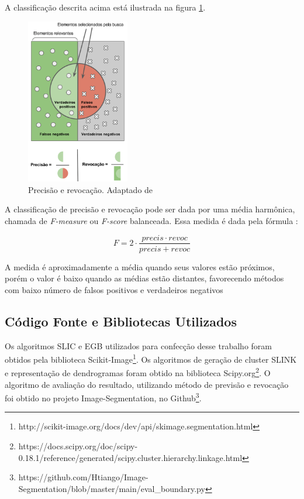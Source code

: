 \begin{document}
A classificação descrita acima está ilustrada na figura \ref{fig:PREC_RECALL}. 

\begin{figure}[ht]
\centering
\includegraphics[width=0.4\textwidth]{precision_recall.png}
\caption{Precisão e revocação. Adaptado de \cite{WIKI_PREC_RECALL}}
\label{fig:PREC_RECALL}
\end{figure}

A classificação de precisão e revocação pode ser dada por uma média harmônica, chamada de \textit{F-measure} ou \textit{F-score} balanceada. Essa medida é dada pela fórmula \cite{WIKI_PREC_RECALL}:

\begin{equation}
 F=2 \cdot \frac{precis \cdot revoc}{precis+revoc}
\end{equation}

A medida é aproximadamente a média quando seus valores estão próximos, porém o valor é baixo quando as médias estão distantes, favorecendo métodos com baixo número de falsos positivos e verdadeiros negativos \cite{WIKI_PREC_RECALL}


\subsection{Código Fonte e Bibliotecas Utilizados} \label{ssec:cod_fonte}

Os algoritmos SLIC e EGB utilizados para confecção desse trabalho foram obtidos pela biblioteca Scikit-Image\footnote{http://scikit-image.org/docs/dev/api/skimage.segmentation.html}. 
Os algoritmos de geração de cluster SLINK e representação de dendrogramas foram obtido na biblioteca Scipy.org\footnote{https://docs.scipy.org/doc/scipy-0.18.1/reference/generated/scipy.cluster.hierarchy.linkage.html}. 
O algoritmo de avaliação do resultado, utilizando método de previsão e revocação foi obtido no projeto Image-Segmentation, no Github\footnote{https://github.com/Htiango/Image-Segmentation/blob/master/main/eval\_boundary.py}.
\end{document}

